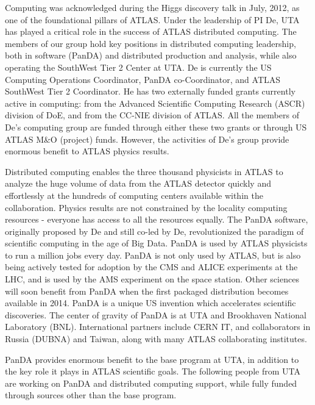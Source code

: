 
Computing was acknowledged during the Higgs discovery talk in July, 2012, as one of the foundational pillars of ATLAS. Under the leadership of PI De, UTA has played a critical role in the success of ATLAS distributed computing. The members of our group hold key positions in distributed computing leadership, both in software (PanDA) and distributed production and analysis, while also operating the SouthWest Tier 2 Center at UTA. De is currently the US Computing Operations Coordinator, PanDA co-Coordinator, and ATLAS SouthWest Tier 2 Coordinator. He has two externally funded grants currently active in computing: from the Advanced Scientific Computing Research (ASCR) division of DoE, and from the CC-NIE division of ATLAS. All the members of De's computing group are funded through either these two grants or through US ATLAS M\&O (project) funds. However, the activities of De's group provide enormous benefit to ATLAS physics results.

Distributed computing enables the three thousand physicists in ATLAS to analyze the huge volume of data from the ATLAS detector quickly and effortlessly at the hundreds of computing centers available within the collaboration. Physics results are not constrained by the locality computing resources - everyone has access to all the resources equally. The PanDA software, originally proposed by De and still co-led by De, revolutionized the paradigm of scientific computing in the age of Big Data. PanDA is used by ATLAS physicists to run a million jobs every day. PanDA is not only used by ATLAS, but is also being actively tested for adoption by the CMS and ALICE experiments at the LHC, and is used by the AMS experiment on the space station. Other sciences will soon benefit from PanDA when the first packaged distribution becomes available in 2014. PanDA is a unique US invention which accelerates scientific discoveries. The center of gravity of PanDA is at UTA and Brookhaven National Laboratory (BNL). International partners include CERN IT, and collaborators in Russia (DUBNA) and Taiwan, along with many ATLAS collaborating institutes.

PanDA provides enormous benefit to the base program at UTA, in addition to the key role it plays in ATLAS scientific goals. The following people from UTA are  working on PanDA and distributed computing support, while fully funded through sources other than the base program.

